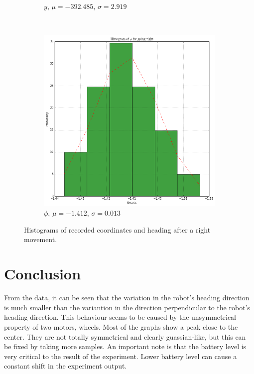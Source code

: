 \documentclass[paper=a4, fontsize=11pt]{scrartcl} %
\begin{document}
\begin{figure}[h!]
\begin{subfigure}[b]{0.3\textwidth}
        \caption{$y$, $\mu = -392.485$, $\sigma = 2.919$}
    \end{subfigure}
    ~
    \begin{subfigure}[b]{0.3\textwidth}
        \setlength{\fboxsep}{0.5pt} %
        \setlength{\fboxrule}{0.5pt}
        \includegraphics[width=\textwidth,fbox]{images/histogram_5_phi_right.png}
        \caption{$\phi$, $\mu = -1.412$, $\sigma = 0.013$}
    \end{subfigure}
    \caption{Histograms of recorded coordinates and heading after a right movement.}
\end{figure}

\newpage
\section{Conclusion}
From the data, it can be seen that the variation in the robot's heading direction is much smaller than the variantion in the direction perpendicular to the robot's heading direction.
This behaviour seems to be caused by the unsymmetrical property of two motors, wheels. Most of the graphs show a peak close to the center. They are not totally symmetrical and clearly guassian-like, but this can be fixed by taking more samples. An important note is that the battery level is very critical to the result of the experiment. Lower battery level can cause a constant shift in the experiment output.
\end{document}

